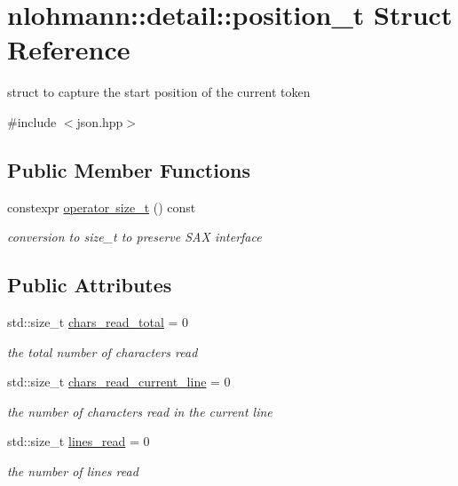 \hypertarget{structnlohmann_1_1detail_1_1position__t}{}\section{nlohmann\+::detail\+::position\+\_\+t Struct Reference}
\label{structnlohmann_1_1detail_1_1position__t}


struct to capture the start position of the current token  




{\ttfamily \#include $<$json.\+hpp$>$}

\subsection*{Public Member Functions}
\begin{DoxyCompactItemize}
\item 
constexpr \mbox{\hyperlink{structnlohmann_1_1detail_1_1position__t_ac9ad1e0f143f162e2e0c979cd678d683}{operator size\+\_\+t}} () const
\begin{DoxyCompactList}\small\item\em conversion to size\+\_\+t to preserve S\+AX interface \end{DoxyCompactList}\end{DoxyCompactItemize}
\subsection*{Public Attributes}
\begin{DoxyCompactItemize}
\item 
std\+::size\+\_\+t \mbox{\hyperlink{structnlohmann_1_1detail_1_1position__t_a94cf85cd91d478c20ae143eba906ea1a}{chars\+\_\+read\+\_\+total}} = 0
\begin{DoxyCompactList}\small\item\em the total number of characters read \end{DoxyCompactList}\item 
std\+::size\+\_\+t \mbox{\hyperlink{structnlohmann_1_1detail_1_1position__t_a74df94563dd32102152ceb8c6d9041d8}{chars\+\_\+read\+\_\+current\+\_\+line}} = 0
\begin{DoxyCompactList}\small\item\em the number of characters read in the current line \end{DoxyCompactList}\item 
std\+::size\+\_\+t \mbox{\hyperlink{structnlohmann_1_1detail_1_1position__t_a4bbad8bc2c0d17c1b61c3ce729908b71}{lines\+\_\+read}} = 0
\begin{DoxyCompactList}\small\item\em the number of lines read \end{DoxyCompactList}\end{DoxyCompactItemize}


